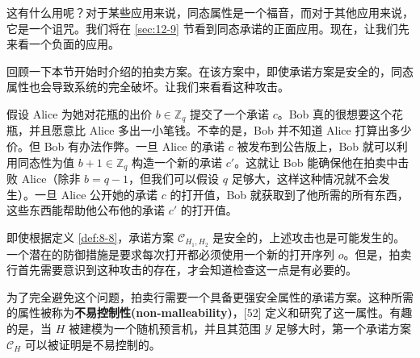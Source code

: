 \begin{snote}[一种同态的承诺方案。]
这有什么用呢？对于某些应用来说，同态属性是一个福音，而对于其他应用来说，它是一个诅咒。我们将在 \ref{sec:12-9} 节看到同态承诺的正面应用。现在，让我们先来看一个负面的应用。

\vspace{5pt}

回顾一下本节开始时介绍的拍卖方案。在该方案中，即使承诺方案是安全的，同态属性也会导致系统的完全破坏。让我们来看看这种攻击。

假设 Alice 为她对花瓶的出价 $b\in\mathbb{Z}_q$ 提交了一个承诺 $c$。Bob 真的很想要这个花瓶，并且愿意比 Alice 多出一小笔钱。不幸的是，Bob 并不知道 Alice 打算出多少价。但 Bob 有办法作弊。一旦 Alice 的承诺 $c$ 被发布到公告版上，Bob 就可以利用同态性为值 $b+1\in\mathbb{Z}_q$ 构造一个新的承诺 $c'$。这就让 Bob 能确保他在拍卖中击败 Alice（除非 $b=q-1$，但我们可以假设 $q$ 足够大，这样这种情况就不会发生）。一旦 Alice 公开她的承诺 $c$ 的打开值，Bob 就获取到了他所需的所有东西，这些东西能帮助他公布他的承诺 $c'$ 的打开值。

即使根据定义 \ref{def:8-8}，承诺方案 $\mathcal{C}_{H_1,H_2}$ 是安全的，上述攻击也是可能发生的。一个潜在的防御措施是要求每次打开都必须使用一个新的打开序列 $o$。但是，拍卖行首先需要意识到这种攻击的存在，才会知道检查这一点是有必要的。

为了完全避免这个问题，拍卖行需要一个具备更强安全属性的承诺方案。这种所需的属性被称为\textbf{不易控制性(non-malleability)}，[52] 定义和研究了这一属性。有趣的是，当 $H$ 被建模为一个随机预言机，并且其范围 $\mathcal{Y}$ 足够大时，第一个承诺方案 $\mathcal{C}_H$ 可以被证明是不易控制的。
\end{snote}